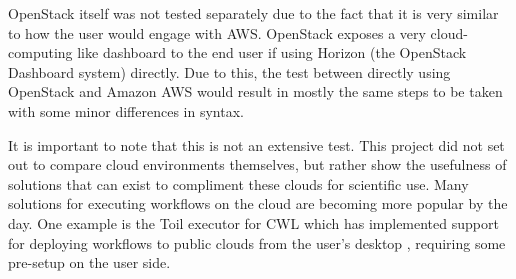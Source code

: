 OpenStack itself was not tested separately due to the fact that it is very similar to how the user would engage with AWS. OpenStack exposes a very cloud-computing like dashboard to the end user if using Horizon (the OpenStack Dashboard system) directly. Due to this, the test between directly using OpenStack and Amazon AWS would result in mostly the same steps to be taken with some minor differences in syntax.

It is important to note that this is not an extensive test. This project did not set out to compare cloud environments themselves, but rather show the usefulness of solutions that can exist to compliment these clouds for scientific use. Many solutions for executing workflows on the cloud are becoming more popular by the day. One example is the Toil executor for CWL which has implemented support for deploying workflows to public clouds from the user's desktop \parencite{vivian2017toil}, requiring some pre-setup on the user side.
